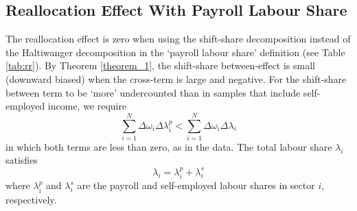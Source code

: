 \subsection{Reallocation Effect With Payroll Labour Share \label{sec: reallocation_payroll}}

The reallocation effect is zero when using the shift-share decomposition instead of the Haltiwanger decomposition in the `payroll labour share' definition (see Table \ref{tab:rr}). By Theorem \ref{theorem_1}, the shift-share between-effect is small (downward biased) when the cross-term is large and negative. For the shift-share between term to be `more' undercounted than in samples that include self-employed income, we require
\begin{equation*}
    \sum_{i=1}^{N} \Delta\omega_{i}\Delta\lambda_{i}^{p} < \sum_{i=1}^{N} \Delta\omega_{i}\Delta\lambda_{i}
\end{equation*}
in which both terms are less than zero, as in the data. The total labour share $\lambda_{i}$ satisfies
\begin{equation}
    \lambda_{i} = \lambda_{i}^{p} + \lambda_{i}^{s}
\label{eqn:labour_share_definition}
\end{equation}
where $\lambda_{i}^{p}$ and $\lambda_{i}^{s}$ are the payroll and self-employed labour shares in sector $i$, respectively. 

